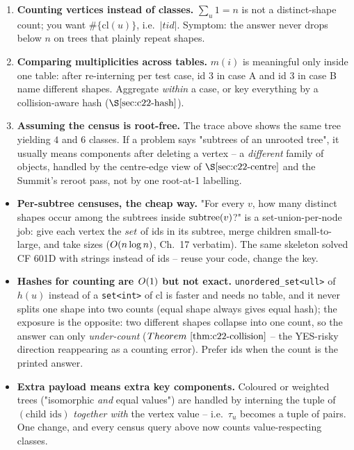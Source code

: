 \begin{warningbox}
\begin{enumerate}[nosep,leftmargin=1.6em]
  \item \textbf{Counting vertices instead of classes.} \(\sum_u 1 = n\) is not a
        distinct-shape count; you want \(\#\{\mathrm{cl}(u)\}\), i.e.\
        \(|\mathit{tid}|\).  Symptom: the answer never drops below \(n\) on
        trees that plainly repeat shapes.
  \item \textbf{Comparing multiplicities across tables.} \(m(i)\) is meaningful
        only inside one table: after re-interning per test case, id \(3\) in case
        A and id \(3\) in case B name different shapes.  Aggregate \emph{within}
        a case, or key everything by a collision-aware hash (\(\secref{c22-hash}\)).
  \item \textbf{Assuming the census is root-free.} The trace above shows the same
        tree yielding \(4\) and \(6\) classes.  If a problem says "subtrees of an
        unrooted tree", it usually means components after deleting a vertex -- a
        \emph{different} family of objects, handled by the centre-edge view of
        \(\secref{c22-centre}\) and the Summit's reroot pass, not by one root-at-1
        labelling.
\end{enumerate}
\end{warningbox}

\begin{hardeningbox}
\begin{itemize}[nosep,leftmargin=1.4em]
  \item \textbf{Per-subtree censuses, the cheap way.} "For every \(v\), how many
        distinct shapes occur among the subtrees inside \(\operatorname{subtree}(v)\)?" is a
        set-union-per-node job: give each vertex the \(\mathit{set}\) of ids in its
        subtree, merge children small-to-large, and take sizes
        (\(O(n\log n)\), Ch.~17 verbatim).  The same skeleton solved CF 601D
        with strings instead of ids -- reuse your code, change the key.
  \item \textbf{Hashes for counting are \(O(1)\) but not exact.}
        \texttt{unordered\_set<ull>} of \(h(u)\) instead of a \texttt{set<int>} of
        \(\mathrm{cl}\) is faster and needs no table, and it never splits one
        shape into two counts (equal shape always gives equal hash); the exposure
        is the opposite: two different shapes collapse into one count, so the
        answer can only \emph{under-count}
        (\(\thmref{c22-collision}\) -- the YES-risky direction reappearing as a
        counting error).  Prefer ids when the count is the printed answer.
  \item \textbf{Extra payload means extra key components.} Coloured or weighted
        trees ("isomorphic \emph{and} equal values") are handled by interning the
        tuple of \((\text{child ids})\) \emph{together with} the vertex value --
        i.e.\ \(\tau_u\) becomes a tuple of pairs.  One change, and every census
        query above now counts value-respecting classes.
\end{itemize}
\end{hardeningbox}

